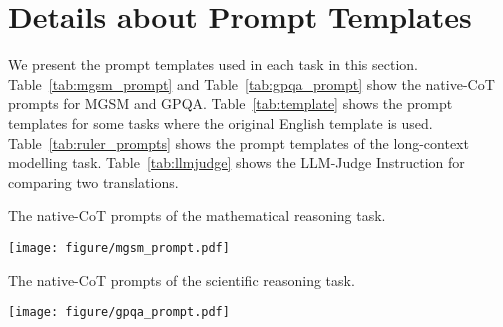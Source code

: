 

\section{Details about Prompt Templates}
\label{sec:prompts}
We present the prompt templates used in each task in this section.
Table~\ref{tab:mgsm_prompt} and Table~\ref{tab:gpqa_prompt} show the native-CoT prompts for MGSM and GPQA.
Table~\ref{tab:template} shows the prompt templates for some tasks where the original English template is used.
Table~\ref{tab:ruler_prompts} shows the prompt templates of the long-context modelling task.
Table~\ref{tab:llmjudge} shows the LLM-Judge Instruction for comparing two translations. 

\begin{table}[ht]
    \caption{The native-CoT prompts of the mathematical reasoning task.}
    \label{tab:mgsm_prompt}
    \vskip 0.15in
    \centering
    \texttt{[image: figure/mgsm\_prompt.pdf]}
\end{table}


\begin{table*}[ht]
    \caption{The native-CoT prompts of the scientific reasoning task.}
    \label{tab:gpqa_prompt}
    \vskip 0.15in
    \centering
    \texttt{[image: figure/gpqa\_prompt.pdf]}
\end{table*}

